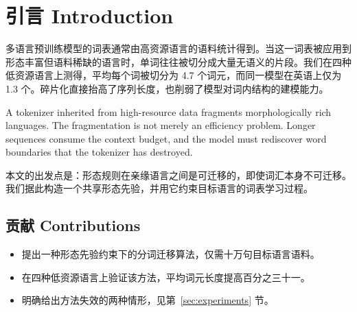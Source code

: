 \section{引言 Introduction}
\label{sec:intro}

多语言预训练模型的词表通常由高资源语言的语料统计得到。当这一词表被应用到
形态丰富但语料稀缺的语言时，单词往往被切分成大量无语义的片段。我们在四种
低资源语言上测得，平均每个词被切分为 4.7 个词元，而同一模型在英语上仅为
1.3 个。碎片化直接抬高了序列长度，也削弱了模型对词内结构的建模能力。

A tokenizer inherited from high-resource data fragments morphologically rich
languages. The fragmentation is not merely an efficiency problem. Longer
sequences consume the context budget, and the model must rediscover word
boundaries that the tokenizer has destroyed.

本文的出发点是：形态规则在亲缘语言之间是可迁移的，即使词汇本身不可迁移。
我们据此构造一个共享形态先验，并用它约束目标语言的词表学习过程。

\subsection{贡献 Contributions}

\begin{itemize}
  \item 提出一种形态先验约束下的分词迁移算法，仅需十万句目标语言语料。
  \item 在四种低资源语言上验证该方法，平均词元长度提高百分之三十一。
  \item 明确给出方法失效的两种情形，见第~\ref{sec:experiments} 节。
\end{itemize}
